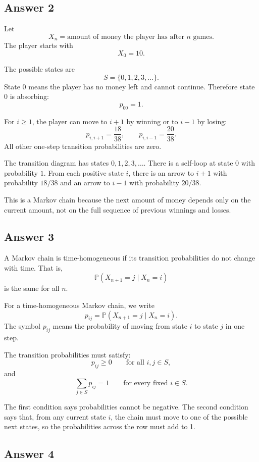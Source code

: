 \documentclass[12pt,a4paper]{article}
\theoremstyle{lecturestyle}
\newcommand{\Prob}{\mathbb{P}}
\begin{document}
\subsection*{Answer 2}

Let
\[
X_n=\text{amount of money the player has after }n\text{ games}.
\]
The player starts with
\[
X_0=10.
\]

The possible states are
\[
S=\{0,1,2,3,\ldots\}.
\]
State $0$ means the player has no money left and cannot continue. Therefore state $0$ is absorbing:
\[
p_{00}=1.
\]

For $i\geq 1$, the player can move to $i+1$ by winning or to $i-1$ by losing:
\[
p_{i,i+1}=\frac{18}{38},
\qquad
p_{i,i-1}=\frac{20}{38}.
\]
All other one-step transition probabilities are zero.

The transition diagram has states $0,1,2,3,\ldots$. There is a self-loop at state $0$ with probability $1$. From each positive state $i$, there is an arrow to $i+1$ with probability $18/38$ and an arrow to $i-1$ with probability $20/38$.

This is a Markov chain because the next amount of money depends only on the current amount, not on the full sequence of previous winnings and losses.

\subsection*{Answer 3}

A Markov chain is time-homogeneous if its transition probabilities do not change with time. That is,
\[
\Prob(X_{n+1}=j\mid X_n=i)
\]
is the same for all $n$.

For a time-homogeneous Markov chain, we write
\[
p_{ij}=\Prob(X_{n+1}=j\mid X_n=i).
\]
The symbol $p_{ij}$ means the probability of moving from state $i$ to state $j$ in one step.

The transition probabilities must satisfy:
\[
p_{ij}\geq 0 \qquad \text{for all }i,j\in S,
\]
and
\[
\sum_{j\in S}p_{ij}=1 \qquad \text{for every fixed }i\in S.
\]

The first condition says probabilities cannot be negative. The second condition says that, from any current state $i$, the chain must move to one of the possible next states, so the probabilities across the row must add to 1.

\subsection*{Answer 4}
\end{document}
